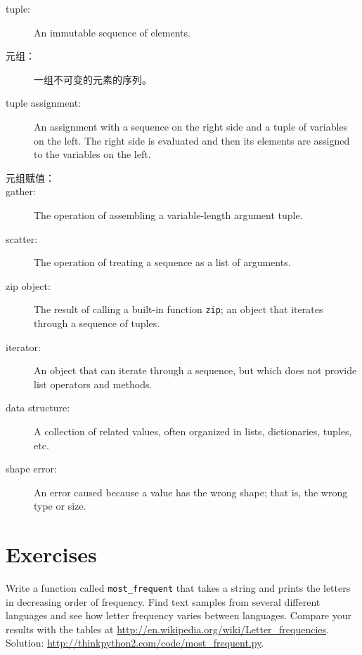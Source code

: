 \begin{description}

\item[tuple:] An immutable sequence of elements.

\item[元组：] 一组不可变的元素的序列。

\item[tuple assignment:] An assignment with a sequence on the
right side and a tuple of variables on the left.  The right
side is evaluated and then its elements are assigned to the
variables on the left.

\item[元组赋值：]

 

\item[gather:] The operation of assembling a variable-length
argument tuple.

\item[scatter:] The operation of treating a sequence as a list of
arguments.

\item[zip object:] The result of calling a built-in function {\tt zip};
an object that iterates through a sequence of tuples.

\item[iterator:] An object that can iterate through a sequence, but
which does not provide list operators and methods.

\item[data structure:] A collection of related values, often
organized in lists, dictionaries, tuples, etc.

\item[shape error:] An error caused because a value has the
wrong shape; that is, the wrong type or size.

\end{description}


\section{Exercises}

\begin{exercise}

Write a function called \verb"most_frequent" that takes a string and
prints the letters in decreasing order of frequency.  Find text
samples from several different languages and see how letter frequency
varies between languages.  Compare your results with the tables at
\url{http://en.wikipedia.org/wiki/Letter_frequencies}.  Solution:
\url{http://thinkpython2.com/code/most_frequent.py}.   

\end{exercise}


